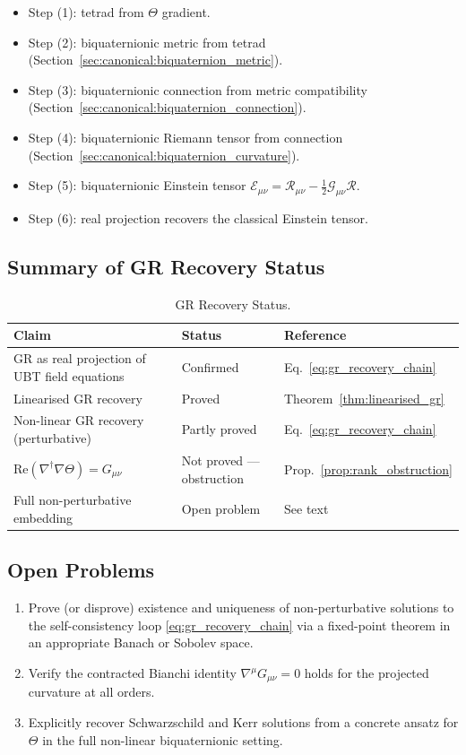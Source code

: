 \begin{itemize}
  \item Step (1): tetrad from $\Theta$ gradient.
  \item Step (2): biquaternionic metric from tetrad (Section~\ref{sec:canonical:biquaternion_metric}).
  \item Step (3): biquaternionic connection from metric compatibility
    (Section~\ref{sec:canonical:biquaternion_connection}).
  \item Step (4): biquaternionic Riemann tensor from connection
    (Section~\ref{sec:canonical:biquaternion_curvature}).
  \item Step (5): biquaternionic Einstein tensor
    $\mathcal{E}_{\mu\nu} = \mathcal{R}_{\mu\nu} - \tfrac{1}{2}\mathcal{G}_{\mu\nu}\mathcal{R}$.
  \item Step (6): real projection recovers the classical Einstein tensor.
\end{itemize}

\subsection{Summary of GR Recovery Status}

\begin{table}[h]
  \centering
  \caption{GR Recovery Status.}
  \label{tab:gr_status}
  \begin{tabular}{lll}
    \hline
    Claim & Status & Reference \\
    \hline
    GR as real projection of UBT field equations & Confirmed & Eq.~\eqref{eq:gr_recovery_chain} \\
    Linearised GR recovery & Proved & Theorem~\ref{thm:linearised_gr} \\
    Non-linear GR recovery (perturbative) & Partly proved & Eq.~\eqref{eq:gr_recovery_chain} \\
    $\mathrm{Re}(\nabla^\dagger\nabla\Theta) = G_{\mu\nu}$ & Not proved --- obstruction & Prop.~\ref{prop:rank_obstruction} \\
    Full non-perturbative embedding & Open problem & See text \\
    \hline
  \end{tabular}
\end{table}

\subsection{Open Problems}

\begin{enumerate}
  \item Prove (or disprove) existence and uniqueness of non-perturbative
    solutions to the self-consistency loop \eqref{eq:gr_recovery_chain}
    via a fixed-point theorem in an appropriate Banach or Sobolev space.
  \item Verify the contracted Bianchi identity
    $\nabla^\mu G_{\mu\nu} = 0$ holds for the projected curvature at all
    orders.
  \item Explicitly recover Schwarzschild and Kerr solutions from a concrete
    ansatz for $\Theta$ in the full non-linear biquaternionic setting.
\end{enumerate}

